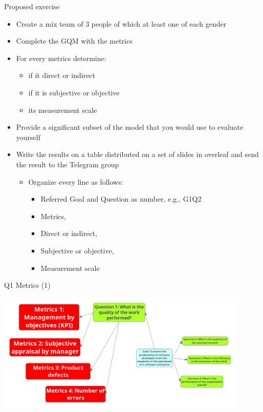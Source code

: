 \documentclass{beamer}
\begin{document}
\begin{frame}{\centerline{Proposed exercise}}


\begin{itemize}
\item Create a mix team of 3 people of which at least one of each gender
\item Complete the GQM with the  metrics
\item For every metrics determine:
\begin{itemize}
\item if it direct or indirect
\item if it is subjective or objective
\item its measurement scale
\end{itemize}
\item Provide a significant subset of the model that you would use to evaluate yourself
\item Write the results on a table distributed on a set of slides in overleaf and send the result to the Telegram group
\begin{itemize}
\item Organize every line as follows:
\begin{itemize}
\item Referred Goal and Question as number, e.g., G1Q2
\item Metrics,
\item Direct or indirect, 
\item Subjective or objective, 
\item Measurement scale
\end{itemize}
\end{itemize}
\end{itemize}
\end{frame}

\begin{frame}{\centerline{Q1 Metrics (1)}}

\begin{center}
\includegraphics[width=120mm]{A2022.ScaleDeiDati/20180904_CaseStudy_GoalQuestions_M1.png}
\newline
\end{center}

\end{frame}
\end{document}
